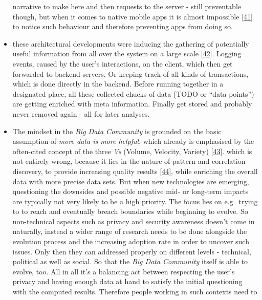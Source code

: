 \documentclass[12pt,english,a4paper,titlepage,cleardoublepage=empty,dottedtoc]{report}
\begin{document}
\begin{itemize}
  narrative to make here and then requests to the server - still
  preventable though, but when it comes to native mobile apps it is
  almost impossible
  {[}\protect\hyperlink{ref-web_2016_answers-io}{41}{]} to notice such
  behaviour and therefore preventing apps from doing so.
\item
  these architectural developments were inducing the gathering of
  potentially useful information from all over the system on a large
  scale
  {[}\protect\hyperlink{ref-web_2016_big-data-enthusiasts-should-not-ignore}{42}{]}.
  Logging events, caused by the user's interactions, on the client,
  which then get forwarded to backend servers. Or keeping track of all
  kinds of transactions, which is done directly in the backend. Before
  running together in a designated place, all these collected chucks of
  data (TODO or ``data points'') are getting enriched with meta
  information. Finally get stored and probably never removed again - all
  for later analyses.
\item
  The mindset in the \emph{Big Data Community} is grounded on the basic
  assumption of \emph{more data is more helpful}, which already is
  emphasised by the often-cited concept of the three \emph{Vs} (Volume,
  Velocity, Variety)
  {[}\protect\hyperlink{ref-report_2001_3d-data-management-controlling-data-volume-velocity-and-variety}{43}{]}.
  which is not entirely wrong, because it lies in the nature of pattern
  and correlation discovery, to provide increasing quality results
  {[}\protect\hyperlink{ref-paper_2015_big-data-for-development-a-review-of-promises-and-challenges:more-data}{44}{]},
  while enriching the overall data with more precise data sets. But when
  new technologies are emerging, questioning the downsides and possible
  negative mid- or long-term impacts are typically not very likely to be
  a high priority. The focus lies on e.g.~trying to to reach and
  eventually breach boundaries while beginning to evolve. So
  non-technical aspects such as privacy and security awareness doesn't
  come in naturally, instead a wider range of research needs to be done
  alongside the evolution process and the increasing adoption rate in
  order to uncover such issues. Only then they can addressed properly on
  different levels - technical, political as well as social. So that the
  \emph{Big Data Community} itself is able to evolve, too. All in all
  it's a balancing act between respecting the user's privacy and having
  enough data at hand to satisfy the initial questioning with the
  computed results. Therefore people working in such contexts need to

\end{itemize}
\end{document}
